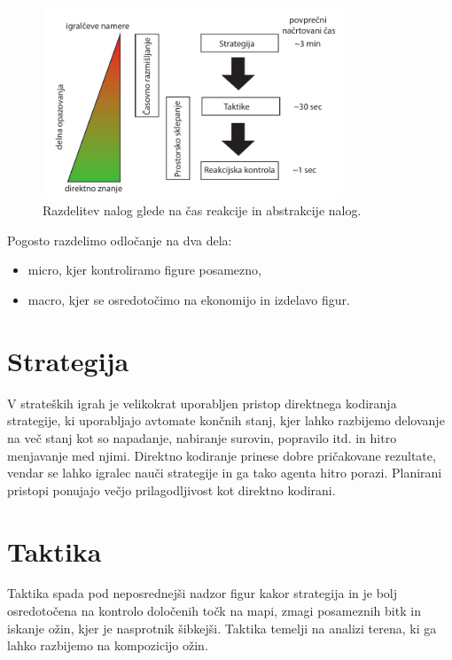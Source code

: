 \documentclass[a4paper, 12pt]{book}
\begin{document}
\begin{itemize}
	\begin{figure}[h]
		\begin{center}
			\includegraphics[width=0.8\textwidth]{photos/RazdelitevNalog.pdf}
		\end{center}
		\caption{Razdelitev nalog glede na čas reakcije in abstrakcije nalog.}
		\label{picRazdelitevNalog}
	\end{figure}
	
	Pogosto razdelimo odločanje na dva dela:
	\begin{itemize}
		\item micro, kjer kontroliramo figure posamezno,
		\item macro, kjer se osredotočimo na ekonomijo in izdelavo figur.
	\end{itemize}
\end{itemize}

\section{Strategija}
V strateških igrah je velikokrat uporabljen pristop direktnega kodiranja strategije, ki uporabljajo avtomate končnih stanj, kjer lahko razbijemo delovanje na več stanj kot so napadanje, nabiranje surovin, popravilo itd. in hitro menjavanje med njimi. 
Direktno kodiranje prinese dobre pričakovane rezultate, vendar se lahko igralec nauči strategije in ga tako agenta hitro porazi.
Planirani pristopi ponujajo večjo prilagodljivost kot direktno kodirani.
\section{Taktika}
Taktika spada pod neposrednejši nadzor figur kakor strategija in je bolj osredotočena na kontrolo določenih točk na mapi, zmagi posameznih bitk in iskanje ožin, kjer je nasprotnik šibkejši. 
Taktika temelji na analizi terena, ki ga lahko razbijemo na kompozicijo ožin.
\end{document}
